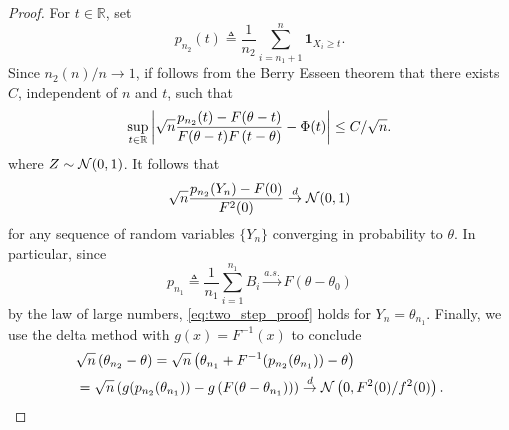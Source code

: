 %
%
\begin{proof}
For $t\in \mathbb R$, set
\begin{equation*}
p_{n_2}(t) \triangleq \frac{1}{n_2} \sum_{i=n_1+1}^{n} \mathbf 1_{X_i \geq t}. 
\end{equation*}
Since $n_2(n)/n \to 1$, if follows from the Berry Esseen theorem that there exists $C$, independent of $n$ and $t$, such that 
\begin{align*}
\sup_{t \in \mathbb{R}} \left| \sqrt{n} \frac{ p_{n_2}(t) - F( \theta - t)} {F(\theta - t) F \left( t - \theta\right) }  - \Phi(t) \right|  \leq C/\sqrt{n}. 
\end{align*}
where $Z \sim \mathcal{N}(0,1)$. It follows that
\begin{align}
\label{eq:two_step_proof}
 \sqrt{n} \frac{ p_{n_2}(Y_n) - F(0)} {F^2(0) }  \overset{d}{\rightarrow} \mathcal{N}(0,1)
\end{align}
for any sequence of random variables $\{Y_n\}$ converging in probability to $\theta$. In particular, since
\begin{equation*}
p_{n_1} \triangleq \frac{1}{n_1} \sum_{i=1}^{n_1} B_i \overset{a.s.}{\rightarrow} F(\theta - \theta_0)
\end{equation*}
by the law of large numbers, \eqref{eq:two_step_proof} holds for $Y_n = \theta_{n_1}$. Finally, we use the delta method with $g(x) = F^{-1}(x)$ to conclude
\begin{align*}
& \sqrt{n}\left( \theta_{n_2} - \theta \right) = \sqrt{n} \left( \theta_{n_1} + F^{-1}(p_{n_2}(\theta_{n_1})) - \theta \right) \\
&= \sqrt{n} \left( g(p_{n_2}(\theta_{n_1})) - g \left(F(\theta-\theta_{n_1}) \right)  \right) \overset{d}{\to} \mathcal{N}\left(0, 
F^2(0)/ f^2(0) \right).
\end{align*}
\end{proof}
%


